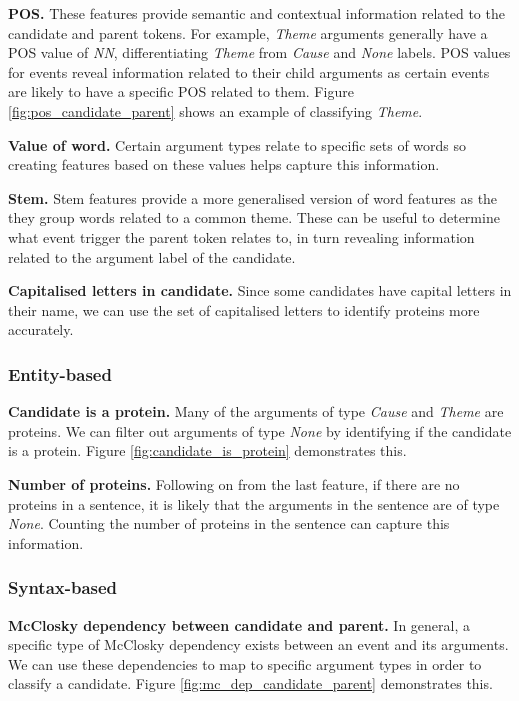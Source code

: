 \documentclass{article} %
\begin{document}
\textbf{POS.} These features provide semantic and contextual information related to the candidate and parent tokens. For example, \emph{Theme} arguments generally have a POS value of \emph{NN}, differentiating \emph{Theme} from \emph{Cause} and \emph{None} labels. POS values for events reveal information related to their child arguments as certain events are likely to have a specific POS related to them. Figure \ref{fig:pos_candidate_parent} shows an example of classifying \emph{Theme}.

\textbf{Value of word.} Certain argument types relate to specific sets of words so creating features based on these values helps capture this information.

\textbf{Stem.} Stem features provide a more generalised version of word features as the they group words related to a common theme. These can be useful to determine what event trigger the parent token relates to, in turn revealing information related to the argument label of the candidate.

\textbf{Capitalised letters in candidate.} \cite{3} Since some candidates have capital letters in their name, we can use the set of capitalised letters to identify proteins more accurately.

\subsubsection{Entity-based}

\textbf{Candidate is a protein.} Many of the arguments of type \emph{Cause} and \emph{Theme} are proteins. We can filter out arguments of type \emph{None} by identifying if the candidate is a protein. Figure \ref{fig:candidate_is_protein} demonstrates this.

\textbf{Number of proteins.} Following on from the last feature, if there are no proteins in a sentence, it is likely that the arguments in the sentence are of type \emph{None}. Counting the number of proteins in the sentence can capture this information.

\subsubsection{Syntax-based}

\textbf{McClosky dependency between candidate and parent.} \cite{1} In general, a specific type of McClosky dependency exists between an event and its arguments. We can use these dependencies to map to specific argument types in order to classify a candidate. Figure \ref{fig:mc_dep_candidate_parent} demonstrates this.
\end{document}
